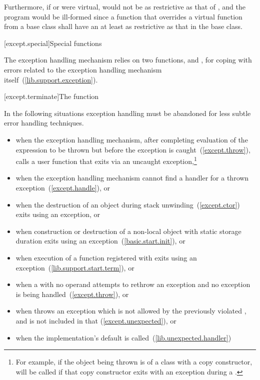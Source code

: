 Furthermore, if
or
were virtual,
would not be as restrictive as that of
,
and the program would be ill-formed since a function that overrides a virtual
function from a base class shall have an 
 at least as restrictive as that in the base class.
\exitexample

[except.special]{Special functions}

\pnum
The exception handling mechanism relies on two functions,
 and
, for coping with errors related to the exception handling
mechanism itself~(\ref{lib.support.exception}).

[except.terminate]{The  function}

\pnum
{}%
In the following situations exception handling must be abandoned
for less subtle error handling techniques.

%
\begin{itemize}
\item%
when the exception handling mechanism, after completing
evaluation of the expression to be thrown but before
the exception is caught~(\ref{except.throw}),
calls a user function that exits via an uncaught exception,\footnote{For
example, if the object being thrown is of a class with a copy constructor,
 will be called if that copy constructor exits with an
exception during a .}

\item%
when the exception handling mechanism cannot find a handler for a thrown exception~(\ref{except.handle}), or

\item%
when the destruction of an object during stack unwinding~(\ref{except.ctor})
exits using an exception, or

\item%
when construction or destruction of a non-local
object with static storage duration
exits using an exception~(\ref{basic.start.init}), or

\item%
when execution of a function registered with
exits using an exception~(\ref{lib.support.start.term}), or

\item%
when a
with no operand attempts to rethrow an exception and no exception is being
handled~(\ref{except.throw}), or

\item%
when
throws an exception which is not allowed by the previously violated
,
and
is not included in that
 (\ref{except.unexpected}), or

\item%
when the implementation's default 
is called~(\ref{lib.unexpected.handler})

\end{itemize}

